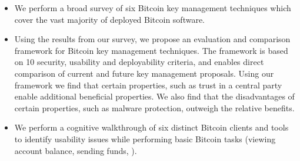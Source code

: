 \begin{itemize}
\item We perform a broad survey of six Bitcoin key management techniques which cover the vast majority of deployed Bitcoin software. 

\item Using the results from our survey, we propose an evaluation and comparison framework for Bitcoin key management techniques. The framework is based on 10 security, usability and deployability criteria, and enables direct comparison of current and future key management proposals. Using our framework we find that certain properties, such as trust in a central party enable additional beneficial properties. We also find that the disadvantages of certain properties, such as malware protection, outweigh the relative benefits.

\item We perform a cognitive walkthrough of six distinct Bitcoin clients and tools to identify usability issues while performing basic Bitcoin tasks (\eg viewing account balance, sending funds, \etc).  

\end{itemize}



